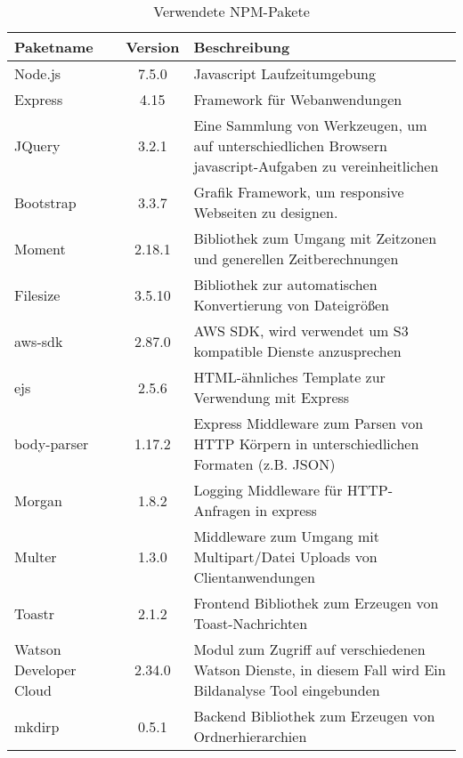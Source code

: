 \begin{table}
	\centering
		\begin{tabular}{ l | c | p{8cm}}
			\hline
			Paketname & Version & Beschreibung \\ \hline
			Node.js & 7.5.0 & Javascript Laufzeitumgebung \\
			Express & 4.15 & Framework für Webanwendungen \\
			JQuery & 3.2.1 & Eine Sammlung von Werkzeugen, um auf unterschiedlichen Browsern javascript-Aufgaben zu vereinheitlichen \\
			Bootstrap & 3.3.7 & Grafik Framework, um responsive Webseiten zu designen. \\
			Moment & 2.18.1 & Bibliothek zum Umgang mit Zeitzonen und generellen Zeitberechnungen \\
			Filesize & 3.5.10 & Bibliothek zur automatischen Konvertierung von Dateigrößen \\
			aws-sdk & 2.87.0 & AWS SDK, wird verwendet um S3 kompatible Dienste anzusprechen \\
			ejs & 2.5.6 & HTML-ähnliches Template zur Verwendung mit Express \\
			body-parser & 1.17.2 & Express Middleware zum Parsen von HTTP Körpern in unterschiedlichen Formaten (z.B. JSON)\\
			Morgan & 1.8.2 & Logging Middleware für HTTP-Anfragen in express \\
			Multer & 1.3.0 & Middleware zum Umgang mit Multipart/Datei Uploads von Clientanwendungen \\
			Toastr & 2.1.2 & Frontend Bibliothek zum Erzeugen von Toast-Nachrichten \\
			Watson Developer Cloud & 2.34.0 & Modul zum Zugriff auf verschiedenen Watson Dienste, in diesem Fall wird Ein Bildanalyse Tool eingebunden \\
			mkdirp & 0.5.1 & Backend Bibliothek zum Erzeugen von Ordnerhierarchien
		\end{tabular}
		\caption{Verwendete NPM-Pakete}
		\label{tab:npmpackages}
\end{table}
